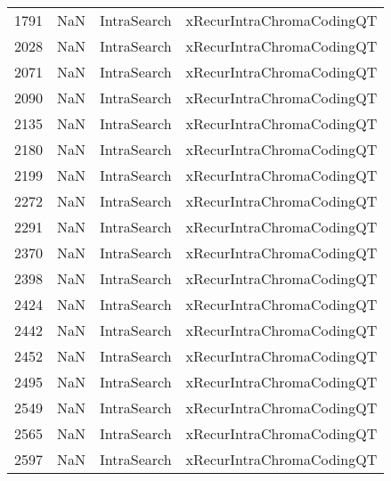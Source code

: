 \begin{tabular}{llll}
1791 &                   NaN &                IntraSearch &                 xRecurIntraChromaCodingQT \\
2028 &                   NaN &                IntraSearch &                 xRecurIntraChromaCodingQT \\
2071 &                   NaN &                IntraSearch &                 xRecurIntraChromaCodingQT \\
2090 &                   NaN &                IntraSearch &                 xRecurIntraChromaCodingQT \\
2135 &                   NaN &                IntraSearch &                 xRecurIntraChromaCodingQT \\
2180 &                   NaN &                IntraSearch &                 xRecurIntraChromaCodingQT \\
2199 &                   NaN &                IntraSearch &                 xRecurIntraChromaCodingQT \\
2272 &                   NaN &                IntraSearch &                 xRecurIntraChromaCodingQT \\
2291 &                   NaN &                IntraSearch &                 xRecurIntraChromaCodingQT \\
2370 &                   NaN &                IntraSearch &                 xRecurIntraChromaCodingQT \\
2398 &                   NaN &                IntraSearch &                 xRecurIntraChromaCodingQT \\
2424 &                   NaN &                IntraSearch &                 xRecurIntraChromaCodingQT \\
2442 &                   NaN &                IntraSearch &                 xRecurIntraChromaCodingQT \\
2452 &                   NaN &                IntraSearch &                 xRecurIntraChromaCodingQT \\
2495 &                   NaN &                IntraSearch &                 xRecurIntraChromaCodingQT \\
2549 &                   NaN &                IntraSearch &                 xRecurIntraChromaCodingQT \\
2565 &                   NaN &                IntraSearch &                 xRecurIntraChromaCodingQT \\
2597 &                   NaN &                IntraSearch &                 xRecurIntraChromaCodingQT \\

\end{tabular}
